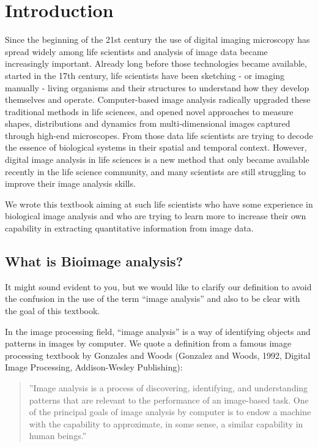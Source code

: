\section{Introduction}\label{introduction}

Since the beginning of the 21st century the use of digital imaging microscopy has spread widely among life scientists and analysis of image data became increasingly important. Already long before those technologies became available, started in the 17th century, life scientists have been sketching - or imaging manually - living organisms and their structures to understand how they develop themselves and operate.
Computer-based image analysis radically upgraded these
traditional methods in life sciences, and opened novel approaches to measure shapes, distributions and dynamics from multi-dimensional images captured through high-end microscopes. From those data life scientists are trying to
decode the essence of biological systems in their spatial and temporal context. However, digital image analysis in life sciences is a new method that only became available recently in the life science community, and many scientists are still struggling to improve their image analysis skills.

We wrote this textbook aiming at such life scientists who have some
experience in biological image analysis and who are trying to learn more to
increase their own capability in extracting quantitative information
from image data.

\subsection{What is Bioimage analysis?}\label{what-is-bioimage-analysis}

It might sound evident to you, but we would like
to clarify our definition to avoid the confusion in the use of the term
``image analysis'' and also to be clear with the goal of this textbook.

In the image processing field, ``image analysis'' is a way of
identifying objects and patterns in images by computer. We quote a definition from
a famous image processing textbook by Gonzales and Woods (Gonzalez and Woods,
1992, Digital Image Processing, Addison-Wesley Publishing):

\begin{quote}
''Image analysis is a process of discovering, identifying, and
understanding patterns that are relevant to the performance of an
image-based task. One of the principal goals of image analysis by
computer is to endow a machine with the capability to approximate, in
some sense, a similar capability in human beings.'' 
\end{quote}

